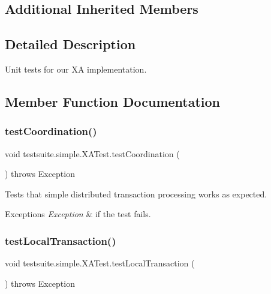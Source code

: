 \subsection*{Additional Inherited Members}


\subsection{Detailed Description}
Unit tests for our XA implementation. 

\subsection{Member Function Documentation}
\mbox{\label{classtestsuite_1_1simple_1_1_x_a_test_ac5d7e1565f556c03ca6ba2a11a6de5fa}} 
\subsubsection{\texorpdfstring{test\+Coordination()}{testCoordination()}}
{\footnotesize\ttfamily void testsuite.\+simple.\+X\+A\+Test.\+test\+Coordination (\begin{DoxyParamCaption}{ }\end{DoxyParamCaption}) throws Exception}

Tests that simple distributed transaction processing works as expected.


\begin{DoxyExceptions}{Exceptions}
{\em Exception} & if the test fails. \\
\hline
\end{DoxyExceptions}
\mbox{\label{classtestsuite_1_1simple_1_1_x_a_test_aeb2dc398d807c4028e784f85aba58457}} 
\subsubsection{\texorpdfstring{test\+Local\+Transaction()}{testLocalTransaction()}}
{\footnotesize\ttfamily void testsuite.\+simple.\+X\+A\+Test.\+test\+Local\+Transaction (\begin{DoxyParamCaption}{ }\end{DoxyParamCaption}) throws Exception}

